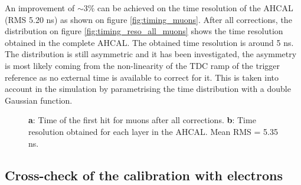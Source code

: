 \documentclass[twoside,a4paper,11pt]{article}
\begin{document}
An improvement of $\sim$3\% can be achieved on the time resolution of the AHCAL (RMS 5.20 ns) as shown on figure \ref{fig:timing_muons}. After all corrections, the distribution on figure \ref{fig:timing_reso_all_muons} shows the time resolution obtained in the complete AHCAL. The obtained time resolution is around 5 ns. The distribution is still asymmetric and it has been investigated, the asymmetry is most likely coming from the non-linearity of the TDC ramp of the trigger reference as no external time is available to correct for it. This is taken into account in the simulation by parametrising the time distribution with a double Gaussian function.
\begin{figure}[htbp]
	\hfill
	\caption[]{\textbf{a}: Time of the first hit for muons after all corrections. \textbf{b}: Time resolution obtained for each layer in the AHCAL. Mean RMS = 5.35 ns.}
\end{figure}

\subsection{Cross-check of the calibration with electrons}
\label{subsec:validation}
\end{document}
